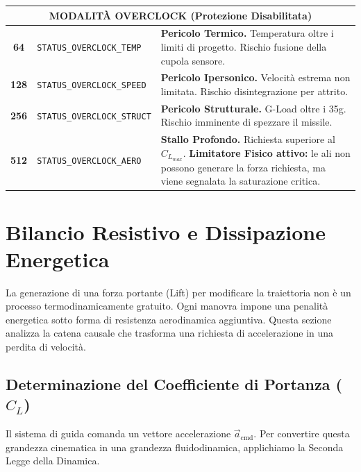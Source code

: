 \documentclass[12pt,a4paper]{article}
\begin{document}
\begin{table}[ht!]
\begin{tabular}{|c|l|p{7.5cm}|}
        \multicolumn{3}{|c|}{\textbf{MODALITÀ OVERCLOCK (Protezione Disabilitata)}} \\
        \hline
        \textbf{64} & \texttt{STATUS\_OVERCLOCK\_TEMP} & \textbf{Pericolo Termico.} Temperatura oltre i limiti di progetto. Rischio fusione della cupola sensore. \\
        \hline
        \textbf{128} & \texttt{STATUS\_OVERCLOCK\_SPEED} & \textbf{Pericolo Ipersonico.} Velocità estrema non limitata. Rischio disintegrazione per attrito. \\
        \hline
        \textbf{256} & \texttt{STATUS\_OVERCLOCK\_STRUCT} & \textbf{Pericolo Strutturale.} G-Load oltre i 35g. Rischio imminente di spezzare il missile. \\
        \hline
        \textbf{512} & \texttt{STATUS\_OVERCLOCK\_AERO} & \textbf{Stallo Profondo.} Richiesta superiore al $C_{L_{max}}$. \textbf{Limitatore Fisico attivo:} le ali non possono generare la forza richiesta, ma viene segnalata la saturazione critica. \\
        \hline
    \end{tabular}
    \label{tab:codici_stato_completi}
\end{table}

\clearpage

\section{Bilancio Resistivo e Dissipazione Energetica}

La generazione di una forza portante (Lift) per modificare la traiettoria non è un processo termodinamicamente gratuito. Ogni manovra impone una penalità energetica sotto forma di resistenza aerodinamica aggiuntiva.
Questa sezione analizza la catena causale che trasforma una richiesta di accelerazione in una perdita di velocità.

\subsection{Determinazione del Coefficiente di Portanza ($C_L$)}
Il sistema di guida comanda un vettore accelerazione $\vec{a}_{\text{cmd}}$. Per convertire questa grandezza cinematica in una grandezza fluidodinamica, applichiamo la Seconda Legge della Dinamica.
\end{document}
